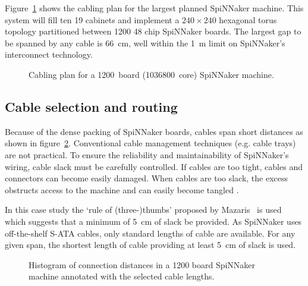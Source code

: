 			Figure~\ref{fig:million-core-machine} shows the cabling plan for the
			largest planned SpiNNaker machine. This system will fill ten 19\inch{}
			cabinets and implement a $240 \times 240$ hexagonal torus topology
			partitioned between \num{1200} 48 chip SpiNNaker boards. The largest gap
			to be spanned by any cable is \SI{66}{\centi\meter}, well within the
			\SI{1}{\meter} limit on SpiNNaker's interconnect technology.
			
			\begin{figure}
				\center
				
				\caption[Cabling plan for a \num{1200}~board SpiNNaker machine.]%
				{Cabling plan for a \num{1200}~board (\num{1036800}~core)
				SpiNNaker machine.}
				\label{fig:million-core-machine}
			\end{figure}
			
		\subsection{Cable selection and routing}
			
			Because of the dense packing of SpiNNaker boards, cables span short
			distances as shown in figure~\ref{fig:wire-length-histogram}.
			Conventional cable management techniques (e.g. cable trays) are not
			practical. To ensure the reliability and maintainability of SpiNNaker's
			wiring, cable slack must be carefully controlled.  If cables are too
			tight, cables and connectors can become easily damaged.  When cables are
			too slack, the excess obstructs access to the machine and can easily
			become tangled \cite{cisco07}.
			
			In this case study the `rule of (three-)thumbs' proposed by
			Mazaris~\cite{mazaris97} is used which suggests that a minimum of
			\SI{5}{\centi\meter} of slack be provided. As SpiNNaker uses
			off-the-shelf S-ATA cables, only standard lengths of cable are available.
			For any given span, the shortest length of cable providing at least
			\SI{5}{\centi\meter} of slack is used.
			
			\begin{figure}
				
				\center
				
				\caption[Cable lengths in a \num{1200}~board SpiNNaker machine.]%
				{Histogram of connection distances in a \num{1200} board SpiNNaker
				machine annotated with the selected cable lengths.}
				\label{fig:wire-length-histogram}
				
			\end{figure}
		

